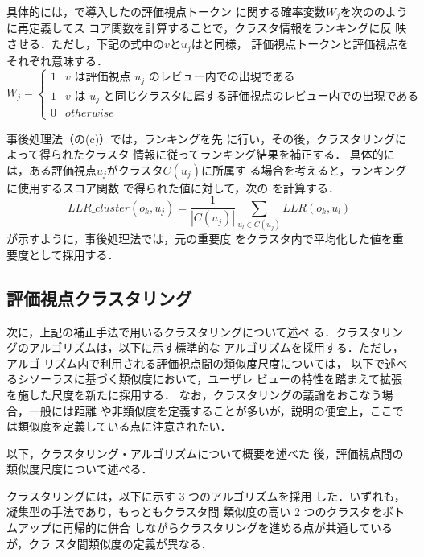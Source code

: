 \documentclass[japanese]{jnlp_1.4}
\def\sec#1{}
\def\eq#1{}
\def\fig#1{}
\begin{document}
具体的には，\sec{llr}で導入した\eq{w}の評価視点トークン
に関する確率変数$W_j$を次の\eq{w2}のように再定義してス
コア関数を計算することで，クラスタ情報をランキングに反
映させる．ただし，下記の式中の$v$と$u_j$は\eq{w}と同様，
評価視点トークンと評価視点をそれぞれ意味する．
\begin{equation}
W_j=\begin{cases}
1 & \text{$v$ は評価視点 $u_j$ のレビュー内での出現である}\\
1 & \text{$v$ は $u_j$ と同じクラスタに属する評価視点のレビュー内での出現である}\\
0 & \mathit{otherwise}
\end{cases}
\label{eq:w2}
\end{equation}


事後処理法（\fig{clustering}の(c)）では，ランキングを先
に行い，その後，クラスタリングによって得られたクラスタ
情報に従ってランキング結果を補正する．
具体的には，ある評価視点$u_j$がクラスタ$C(u_j)$に所属す
る場合を考えると，ランキングに使用するスコア関数
\eq{finalrank}で得られた値に対して，次の
\eq{finalrank2}を計算する．
\begin{equation}
\mathit{LLR}\_\mathit{cluster}(o_k, u_j) = \frac{1}{|C(u_j)|} \sum_{ u_l \in C(u_j)} \mathit{LLR}(o_k,u_l)
\label{eq:finalrank2}
\end{equation}
\eq{finalrank2}が示すように，事後処理法では，元の重要度
をクラスタ内で平均化した値を重要度として採用する．


\subsection{評価視点クラスタリング}
\label{sec:clustering_mothod}

次に，上記の補正手法で用いるクラスタリングについて述べ
る．クラスタリングのアルゴリズムは，以下に示す標準的な
アルゴリズム\cite{clustering}を採用する．ただし，アルゴ
リズム内で利用される評価視点間の類似度尺度については，
以下で述べるシソーラスに基づく類似度において，ユーザレ
ビューの特性を踏まえて拡張を施した尺度を新たに採用する．
なお，クラスタリングの議論をおこなう場合，一般には距離
や非類似度を定義することが多いが，説明の便宜上，ここで
は類似度を定義している点に注意されたい．

以下，クラスタリング・アルゴリズムについて概要を述べた
後，評価視点間の類似度尺度について述べる．

クラスタリングには，以下に示す 3 つのアルゴリズムを採用
した．いずれも，凝集型の手法であり，もっともクラスタ間
類似度の高い 2 つのクラスタをボトムアップに再帰的に併合
しながらクラスタリングを進める点が共通しているが，クラ
スタ間類似度の定義が異なる．
\end{document}
